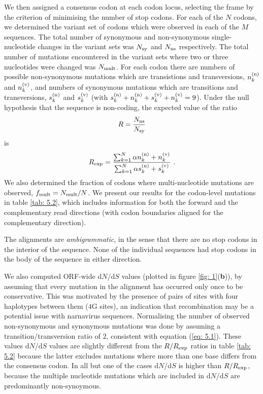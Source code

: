 \documentclass[unnumsec,webpdf,contemporary,large,namedate]{oup-authoring-template}%
\theoremstyle{thmstyleone}%
\theoremstyle{thmstyletwo}%
\theoremstyle{thmstylethree}%
\begin{document}
We then assigned a consensus codon at each codon locus, selecting the
frame by the criterion of minimising the number of stop codons.
For each of the $N$ codons, we determined the variant set of codons
which were observed in each of the $M$ sequences. The total
number of synonymous and non-synonymous single-nucleotide changes in the variant sets
was $N_{\rm sy}$ and $N_{\rm ns}$ respectively. The total number of mutations
encountered in the variant sets where two or three nucleotides were changed was $N_{\rm mult}$.
For each codon there are
numbers of possible non-synonymous mutations which are transistions and transversions,
$n_k^{({\rm n})}$ and $n_k^{({\rm v})}$, and numbers of synonymous mutations
which are transitions and transversions, $s_k^{({\rm n})}$ and $s_k^{({\rm v})}$
(with $s_k^{({\rm n})}+n_k^{({\rm n})}+s_k^{({\rm v})}+n_k^{({\rm v})}=9$). Under the null
hypothesis that the sequence is non-coding, the expected value of the ratio
%
\begin{equation}
\label{eq: 5.2}
R=\frac{N_{\rm ns}}{N_{\rm sy}}
\end{equation}
%
is
%
\begin{equation}
\label{eq: 5.3}
R_{\rm exp}=\frac{\sum_{k=1}^N\alpha n_k^{({\rm n})}+n_k^{({\rm v})}}
{\sum_{k=1}^N\alpha s_k^{({\rm n})}+s_k^{({\rm v})}}
\ .
\end{equation}
%
We also determined the fraction of codons where multi-nucleotide mutations are observed,
$f_{\rm mult}=N_{\rm mult}/N$.
We present our results for the codon-level mutations in table \ref{tab: 5.2}, which includes information
for both the forward and the complementary read directions (with codon boundaries aligned
for the complementary direction).

The alignments are \emph{ambigrammatic}, in the sense that there are no stop codons in the
interior of the sequence. None of the individual sequences had stop codons in the body of the
sequence in either direction.

We also computed ORF-wide d$N$/d$S$ values (plotted in figure \ref{fig: 1}({\bf b})), 
by assuming that every mutation in the alignment has occurred only once to be conservative. 
This was motivated by the presence of pairs of sites with four haplotypes between them ($4$G sites), an
indication that recombination may be a potential issue with narnavirus
sequences.  Normalising the number of observed non-synonymous and synonymous
mutations was done by assuming a transition/transversion ratio of $2$, 
consistent with equation (\ref{eq: 5.1}). These values d$N$/d$S$ values are slightly 
different from the $R/R_{\rm exp}$ ratios in table \ref{tab: 5.2} because the latter excludes 
mutations where more than one base differs from the consensus codon. In all but one of the cases
d$N$/d$S$ is higher than $R/R_{\rm exp}$, because the multiple nucleotide mutations which are 
included in d$N$/d$S$ are predominantly non-synoymous.
\end{document}

